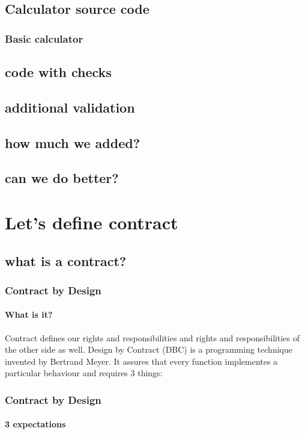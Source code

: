 \documentclass{beamer}
\begin{document}
\subsection{Calculator source code}
\begin{frame}[fragile]
\frametitle{Basic calculator}
\end{frame}

\subsection{code with checks}
\subsection{additional validation}
\subsection{how much we added?}
\subsection{can we do better?}

\section{Let's define contract}
\subsection{what is a contract?}
\begin{frame}
\frametitle{Contract by Design}
\framesubtitle{What is it?}
Contract defines our rights and responsibilities and rights and responsibilities of the other side as well.
Design by Contract (DBC) is a programming technique invented by Bertrand Meyer.
It assures that every function implementes a particular behaviour and requires 3 things:
\end{frame}

\begin{frame}
\frametitle{Contract by Design}
\framesubtitle{3 expectations}



\end{frame}
\end{document}
